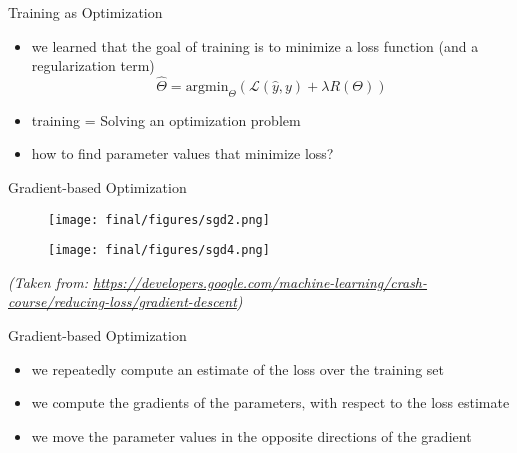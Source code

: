 \begin{frame}{Training as Optimization}
    \begin{itemize}
        \item<1-> we learned that the goal of training is to minimize a loss function (and a regularization term)
        \begin{equation*}
            \hat{\Theta} =\text{argmin}_{\Theta} \left( \mathcal{L}(\hat{y},y)  + \lambda R(\Theta) \right)
        \end{equation*}
        \item<2-> training = Solving an optimization problem
        \item<3-> how to find parameter values that minimize loss?
    \end{itemize}
\end{frame}
\begin{frame}{Gradient-based Optimization}
   
    {
      \begin{figure}
        \centering
        \texttt{[image: final/figures/sgd2.png]}
    \end{figure}      
    }
    {
     \begin{figure}
        \centering
        \texttt{[image: final/figures/sgd4.png]}
    \end{figure}
    }
\vspace*{\fill}
\textit{\tiny{(Taken from: 
\url{https://developers.google.com/machine-learning/crash-course/reducing-loss/gradient-descent})}}
   
\end{frame}
\begin{frame}{Gradient-based Optimization}
    \begin{itemize}
        \item<1-> we repeatedly compute an estimate of the loss over the training set
        \item<2-> we compute the gradients of the parameters‚ with respect to the loss estimate
        \item<3-> we move the parameter values in the opposite directions of the gradient
    \end{itemize}
\end{frame}

